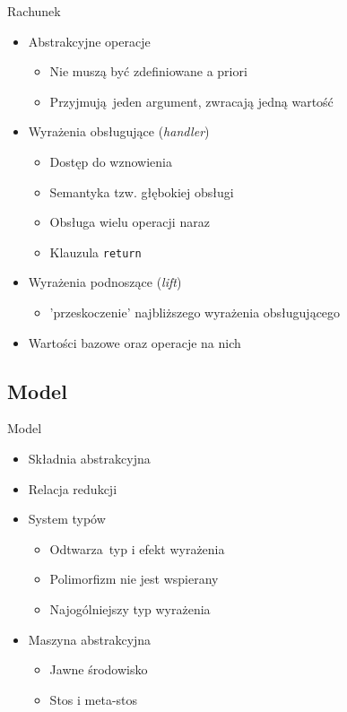 \documentclass{beamer}
\begin{document}
\begin{frame}{Rachunek}
  \begin{itemize}
    \item Abstrakcyjne operacje
    \begin{itemize}
      \item Nie muszą być zdefiniowane a priori
      \item Przyjmują jeden argument, zwracają jedną wartość
    \end{itemize}
    \pause
    \item Wyrażenia obsługujące (\emph{handler})
    \begin{itemize}
      \item Dostęp do wznowienia
      \item Semantyka tzw. głębokiej obsługi
      \item Obsługa wielu operacji naraz
      \item Klauzula \texttt{return}
    \end{itemize}
    \pause
    \item Wyrażenia podnoszące (\emph{lift})
    \begin{itemize}
      \item 'przeskoczenie' najbliższego wyrażenia obsługującego
    \end{itemize}
    \pause
    \item Wartości bazowe oraz operacje na nich
  \end{itemize}
\end{frame}

\subsection{Model}
\begin{frame}{Model}
  \begin{itemize}
    \item Składnia abstrakcyjna
    \item Relacja redukcji
    \pause
    \item System typów
    \begin{itemize}
      \item Odtwarza typ i efekt wyrażenia
      \item Polimorfizm nie jest wspierany
      \item Najogólniejszy typ wyrażenia
    \end{itemize}
    \pause
    \item Maszyna abstrakcyjna
    \begin{itemize}
      \item Jawne środowisko
      \item Stos i meta-stos
    \end{itemize}
  \end{itemize}
\end{frame}
\end{document}
